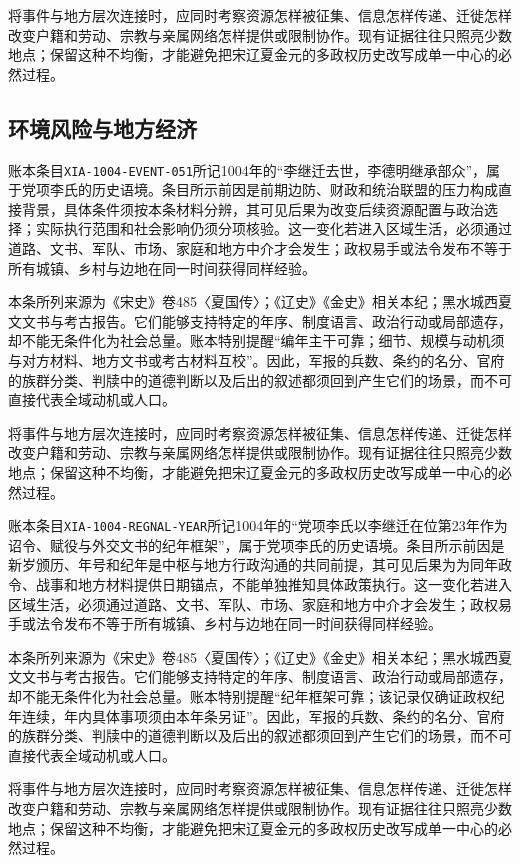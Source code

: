 将事件与地方层次连接时，应同时考察资源怎样被征集、信息怎样传递、迁徙怎样改变户籍和劳动、宗教与亲属网络怎样提供或限制协作。现有证据往往只照亮少数地点；保留这种不均衡，才能避免把宋辽夏金元的多政权历史改写成单一中心的必然过程。

\subsection{环境风险与地方经济}

账本条目\texttt{XIA-1004-EVENT-051}所记1004年的“李继迁去世，李德明继承部众”，属于党项李氏的历史语境。条目所示前因是前期边防、财政和统治联盟的压力构成直接背景，具体条件须按本条材料分辨，其可见后果为改变后续资源配置与政治选择；实际执行范围和社会影响仍须分项核验。这一变化若进入区域生活，必须通过道路、文书、军队、市场、家庭和地方中介才会发生；政权易手或法令发布不等于所有城镇、乡村与边地在同一时间获得同样经验。

本条所列来源为《宋史》卷485〈夏国传〉；《辽史》《金史》相关本纪；黑水城西夏文文书与考古报告。它们能够支持特定的年序、制度语言、政治行动或局部遗存，却不能无条件化为社会总量。账本特别提醒“编年主干可靠；细节、规模与动机须与对方材料、地方文书或考古材料互校”。因此，军报的兵数、条约的名分、官府的族群分类、判牍中的道德判断以及后出的叙述都须回到产生它们的场景，而不可直接代表全域动机或人口。

将事件与地方层次连接时，应同时考察资源怎样被征集、信息怎样传递、迁徙怎样改变户籍和劳动、宗教与亲属网络怎样提供或限制协作。现有证据往往只照亮少数地点；保留这种不均衡，才能避免把宋辽夏金元的多政权历史改写成单一中心的必然过程。

账本条目\texttt{XIA-1004-REGNAL-YEAR}所记1004年的“党项李氏以李继迁在位第23年作为诏令、赋役与外交文书的纪年框架”，属于党项李氏的历史语境。条目所示前因是新岁颁历、年号和纪年是中枢与地方行政沟通的共同前提，其可见后果为为同年政令、战事和地方材料提供日期锚点，不能单独推知具体政策执行。这一变化若进入区域生活，必须通过道路、文书、军队、市场、家庭和地方中介才会发生；政权易手或法令发布不等于所有城镇、乡村与边地在同一时间获得同样经验。

本条所列来源为《宋史》卷485〈夏国传〉；《辽史》《金史》相关本纪；黑水城西夏文文书与考古报告。它们能够支持特定的年序、制度语言、政治行动或局部遗存，却不能无条件化为社会总量。账本特别提醒“纪年框架可靠；该记录仅确证政权纪年连续，年内具体事项须由本年条另证”。因此，军报的兵数、条约的名分、官府的族群分类、判牍中的道德判断以及后出的叙述都须回到产生它们的场景，而不可直接代表全域动机或人口。

将事件与地方层次连接时，应同时考察资源怎样被征集、信息怎样传递、迁徙怎样改变户籍和劳动、宗教与亲属网络怎样提供或限制协作。现有证据往往只照亮少数地点；保留这种不均衡，才能避免把宋辽夏金元的多政权历史改写成单一中心的必然过程。

